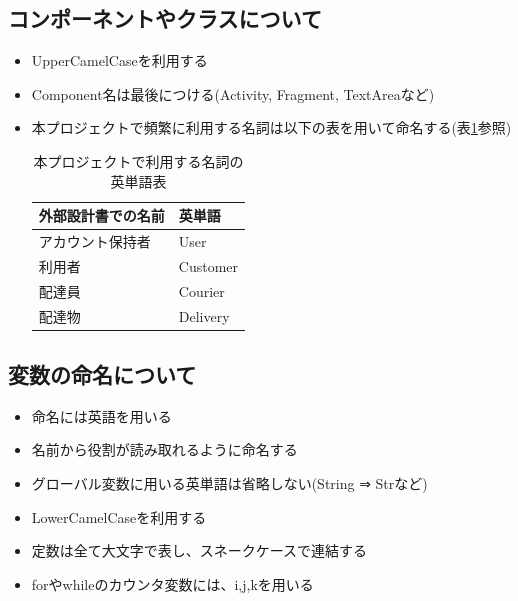 \documentclass[a4j,titlepage]{jarticle}
\begin{document}
\subsection{コンポーネントやクラスについて}
\begin{itemize}
\item UpperCamelCaseを利用する
\item Component名は最後につける(Activity, Fragment, TextAreaなど)
\item 本プロジェクトで頻繁に利用する名詞は以下の表を用いて命名する(表\ref{termTable}参照)
\begin{table}[htb]
\centering
\caption{本プロジェクトで利用する名詞の英単語表}
\label{termTable}
\begin{tabular}{|ll|}
\hline
外部設計書での名前 & 英単語      \\ \hline
アカウント保持者  & User     \\
利用者       & Customer \\
配達員       & Courier  \\
配達物       & Delivery \\ \hline
\end{tabular}
\end{table}
\end{itemize}

\subsection{変数の命名について}
\begin{itemize}
\item 命名には英語を用いる
\item 名前から役割が読み取れるように命名する
\item グローバル変数に用いる英単語は省略しない(String ⇒ Strなど)
\item LowerCamelCaseを利用する
\item 定数は全て大文字で表し、スネークケースで連結する
\item forやwhileのカウンタ変数には、i,j,kを用いる
\end{itemize}
\end{document}
